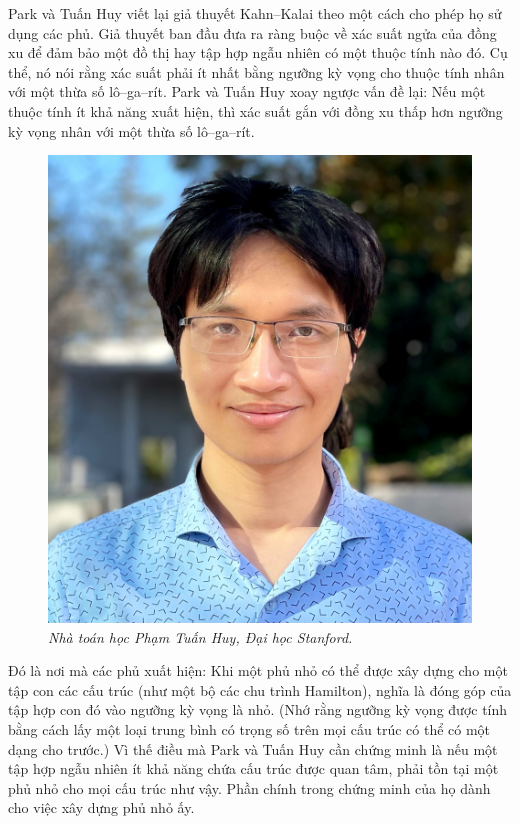 \begin{multicols}{2}
	\vskip 0.1cm
	Park và Tuấn Huy viết lại giả thuyết Kahn--Kalai theo một cách cho phép họ  sử dụng các phủ. Giả thuyết ban đầu đưa ra ràng buộc về xác suất ngửa của đồng xu để  đảm bảo một đồ thị hay tập hợp ngẫu nhiên  có một thuộc tính nào đó. Cụ thể, nó nói rằng xác suất phải ít nhất bằng ngưỡng kỳ vọng cho thuộc tính nhân với một thừa số lô--ga--rít. Park và Tuấn Huy xoay ngược vấn đề lại: Nếu một thuộc tính ít khả năng  xuất hiện, thì xác suất gắn với đồng xu  thấp hơn ngưỡng kỳ vọng nhân với một thừa số lô--ga--rít.
	\begin{figure}[H]
		\vspace*{-5pt}
		\centering
		\captionsetup{labelformat= empty, justification=centering}
		\includegraphics[width= 1\linewidth]{4}
		\caption{\small\textit{\color{duongvaotoanhoc}Nhà toán học Phạm Tuấn Huy, Đại học Stanford.}}
		\vspace*{-10pt}
	\end{figure}
	Đó là nơi mà các phủ xuất hiện: Khi một phủ nhỏ có thể được xây dựng cho một tập con các cấu trúc (như một bộ các chu trình Hamilton), nghĩa là đóng góp của tập hợp con đó  vào ngưỡng kỳ vọng là nhỏ. (Nhớ rằng ngưỡng kỳ vọng được tính bằng cách lấy một loại trung bình có trọng số trên mọi cấu trúc có thể có một dạng cho trước.) Vì thế điều mà Park và Tuấn Huy cần chứng minh là nếu một tập hợp ngẫu nhiên ít khả năng chứa cấu trúc được quan tâm, phải tồn tại một phủ nhỏ cho mọi cấu trúc như vậy. Phần chính trong chứng minh của họ dành cho việc xây dựng phủ nhỏ ấy.

\end{multicols}
